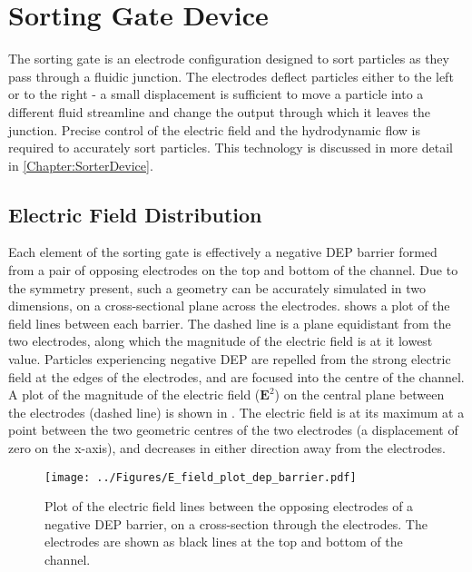 \section{Sorting Gate Device}
\label{sec:sorting_gate_simulation}

The sorting gate is an electrode configuration designed to sort particles as they pass through a fluidic junction. The electrodes deflect particles either to the left or to the right - a small displacement is sufficient to move a particle into a different fluid streamline and change the output through which it leaves the junction. Precise control of the electric field and the hydrodynamic flow is required to accurately sort particles. This technology is discussed in more detail in \cref{Chapter:SorterDevice}.

\subsection{Electric Field Distribution}

Each element of the sorting gate is effectively a negative DEP barrier formed from a pair of opposing electrodes on the top and bottom of the channel. Due to the symmetry present, such a geometry can be accurately simulated in two dimensions, on a cross-sectional plane across the electrodes.  shows a plot of the field lines between each barrier. The dashed line is a plane equidistant from the two electrodes, along which the magnitude of the electric field is at it lowest value. Particles experiencing negative DEP are repelled from the strong electric field at the edges of the electrodes, and are focused into the centre of the channel. A plot of the magnitude of the electric field ($\textbf{E}^{2}$) on the central plane between the electrodes (dashed line) is shown in . The electric field is at its maximum at a point between the two geometric centres of the two electrodes (a displacement of zero on the x-axis), and decreases in either direction away from the electrodes.

\begin{figure}[p]
 \centering
 \texttt{[image: ../Figures/E\_field\_plot\_dep\_barrier.pdf]}
 \caption[Plot of the electric field lines within a negative DEP barrier.]{Plot of the electric field lines between the opposing electrodes of a negative DEP barrier, on a cross-section through the electrodes. The electrodes are shown as black lines at the top and bottom of the channel.}
 \label{fig:E_field_plot_dep_barrier}
\end{figure}

